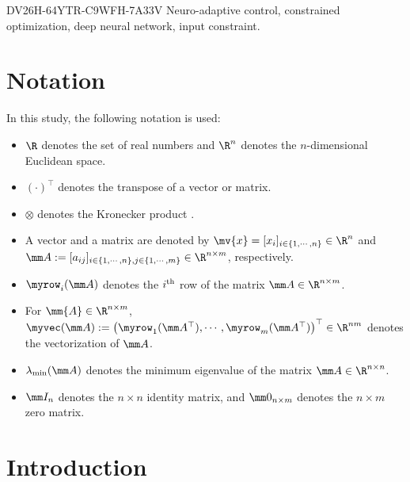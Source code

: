 \documentclass[journal]{IEEEtran}
\begin{document}
\begin{IEEEkeywords}DV26H-64YTR-C9WFH-7A33V
    Neuro-adaptive control, constrained optimization, deep neural network, input constraint.
\end{IEEEkeywords}

\section*{Notation}
In this study, the following notation is used:

\begin{itemize}
    \item $\R$ denotes the set of real numbers and $\R^n$ denotes the $n$-dimensional Euclidean space.
    \item $(\cdot)^\top$ denotes the transpose of a vector or matrix.
    \item $\otimes$ denotes the Kronecker product \cite[Chap. 7 Def. 7.1.2]{Bernstein:2009aa}.
    \item A vector and a matrix are denoted by $\mv{x}=[x_i]_{i\in\{1,\cdots,n\}}\in\R^n$ and $
        \mm A
        := 
        [a_{ij}]
        _{
            i\in\{1,\cdots,n\},j\in\{1,\cdots ,m\}
        }\allowbreak\in\R^{n\times m}
        $, respectively.
    \item $\myrow_i(\mm A)$ denotes the $i\textsuperscript{th}$ row of the matrix $\mm A\in\R^{n\times m}$. 
    \item For $\mm{A}\in\R^{n\times m}$, $\myvec(\mm A):=\left(\myrow_1(\mm A^\top),\cdots,\myrow_m(\mm A^\top) \right)^\top\in\R^{nm}$ denotes the vectorization of $\mm A$.
    \item $\lambda_{\min}(\mm A)$ denotes the minimum eigenvalue of the matrix $\mm A\in\R^{n\times n}$.
    \item $\mm I_n$ denotes the $n\times n$ identity matrix, and $\mm 0_{n\times m}$ denotes the $n\times m$ zero matrix.
\end{itemize}

\section{Introduction}
\end{document}
